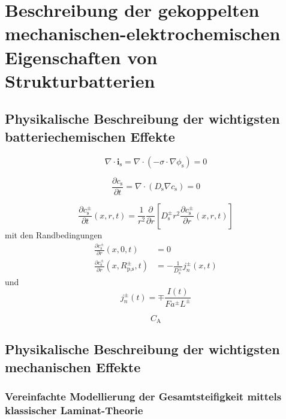\chapter{Beschreibung der gekoppelten mechanischen-elektrochemischen Eigenschaften von Strukturbatterien}

\section{Physikalische Beschreibung der wichtigsten batteriechemischen Effekte}


\begin{equation}
    \nabla \cdot \boldsymbol{i}_{\text{s}} = \nabla \cdot \left( - \sigma \cdot \nabla \phi_{\text{s}} \right) = 0
\end{equation}

\begin{equation}
    \frac{\partial c_{\text{s}}}{\partial t}  = \nabla \cdot \left( D_{\text{s}} \nabla c_{\text{s}} \right) = 0
\end{equation}


\begin{equation}
    \frac{\partial c_{\text{s}}^{\pm}}{\partial t}(x,r,t) = \frac{1}{r^2} \frac{\partial}{ \partial r} \left[ D_{\text{s}}^\pm r^2 \frac{\partial c_{\text{s}}^\pm}{\partial r}(x,r,t)\right]
\end{equation}
mit den Randbedingungen
\begin{align}
    \frac{\partial c_{\text{s}}^{\pm}}{\partial r}(x,0,t) &= 0 \\
    \frac{\partial c_{\text{s}}^{\pm}}{\partial r}(x,R_{\text{p,s}}^{\pm},t) &= -\frac{1}{ D_{\text{s}}^\pm} j_{n}^{\pm}(x,t)
\end{align}
und
\begin{equation}
j_{n}^{\pm}(t) = \mp \frac{I(t)}{F a^{\pm} L^{\pm}}
\end{equation}


\begin{equation}
    C_{\text{A}}
\end{equation}


\section{Physikalische Beschreibung der wichtigsten mechanischen Effekte}
\subsection{Vereinfachte Modellierung der Gesamtsteifigkeit mittels klassischer Laminat-Theorie}


